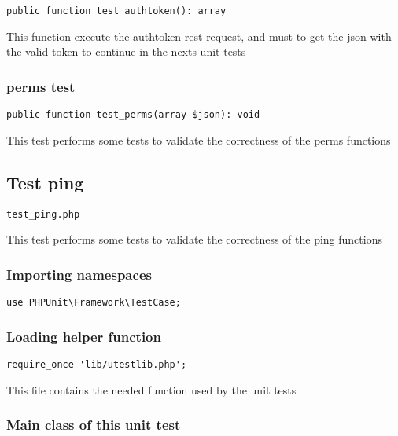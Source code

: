 \documentclass[a4paper]{article}
\begin{document}
\begin{lstlisting}
public function test_authtoken(): array
\end{lstlisting}

This function execute the authtoken rest request, and must to get the
json with the valid token to continue in the nexts unit tests

\hypertarget{toc300}{}
\subsubsection{perms test}

\begin{lstlisting}
public function test_perms(array $json): void
\end{lstlisting}

This test performs some tests to validate the correctness
of the perms functions

\hypertarget{toc301}{}
\subsection{Test ping}

\begin{lstlisting}
test_ping.php
\end{lstlisting}

This test performs some tests to validate the correctness
of the ping functions

\hypertarget{toc302}{}
\subsubsection{Importing namespaces}

\begin{lstlisting}
use PHPUnit\Framework\TestCase;
\end{lstlisting}

\hypertarget{toc303}{}
\subsubsection{Loading helper function}

\begin{lstlisting}
require_once 'lib/utestlib.php';
\end{lstlisting}

This file contains the needed function used by the unit tests

\hypertarget{toc304}{}
\subsubsection{Main class of this unit test}
\end{document}
